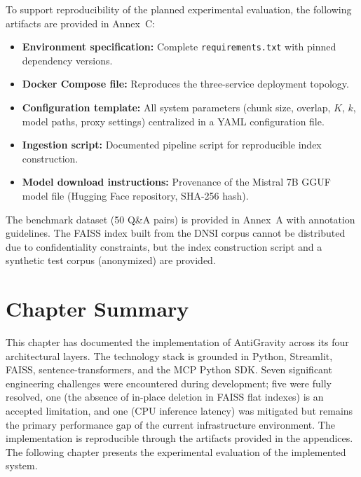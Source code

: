 To support reproducibility of the planned experimental evaluation, the following artifacts are provided in Annex~C:

\begin{itemize}
  \item \textbf{Environment specification:} Complete \texttt{requirements.txt} with pinned dependency versions.
  \item \textbf{Docker Compose file:} Reproduces the three-service deployment topology.
  \item \textbf{Configuration template:} All system parameters (chunk size, overlap, $K$, $k$, model paths, proxy settings) centralized in a YAML configuration file.
  \item \textbf{Ingestion script:} Documented pipeline script for reproducible index construction.
  \item \textbf{Model download instructions:} Provenance of the Mistral 7B GGUF model file (Hugging Face repository, SHA-256 hash).
\end{itemize}

The benchmark dataset (50 Q\&A pairs) is provided in Annex~A with annotation guidelines. The FAISS index built from the DNSI corpus cannot be distributed due to confidentiality constraints, but the index construction script and a synthetic test corpus (anonymized) are provided.

\section{Chapter Summary}
\label{sec:impl-summary}

This chapter has documented the implementation of AntiGravity across its four architectural layers. The technology stack is grounded in Python, Streamlit, FAISS, sentence-transformers, and the MCP Python SDK. Seven significant engineering challenges were encountered during development; five were fully resolved, one (the absence of in-place deletion in FAISS flat indexes) is an accepted limitation, and one (CPU inference latency) was mitigated but remains the primary performance gap of the current infrastructure environment. The implementation is reproducible through the artifacts provided in the appendices. The following chapter presents the experimental evaluation of the implemented system.

